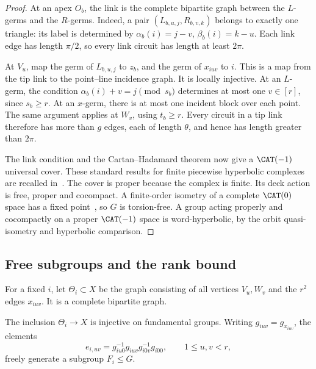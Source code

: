 \begin{proof}
At an apex \(O_b\), the link is the complete bipartite graph between
the \(L\)-germs and the \(R\)-germs. Indeed, a pair
\((L_{b,u,j},R_{b,v,k})\) belongs to exactly one triangle: its label
is determined by
\(\alpha_b(i)=j-v\), \(\beta_b(i)=k-u\).
Each link edge has length \(\pi/2\), so every link circuit has length
at least \(2\pi\).

At \(V_u\), map the germ of \(L_{b,u,j}\) to \(z_b\), and the germ
of \(x_{iuv}\) to \(i\). This is a map from the tip link to the
point--line incidence graph. It is locally injective. At an \(L\)-germ,
the condition \(\alpha_b(i)+v=j\pmod{s_b}\) determines at most one
\(v\in[r]\), since \(s_b\ge r\). At an \(x\)-germ, there is at most
one incident block over each point. The same argument applies at
\(W_v\), using \(t_b\ge r\).
Every circuit in a tip link therefore has more than \(g\) edges, each
of length \(\theta\), and hence has length greater than \(2\pi\).

The link condition and the Cartan--Hadamard theorem now give a
\(\CAT(-1)\) universal cover. These standard results for finite
piecewise hyperbolic complexes are recalled in~\cite[Theorems~I.7.50, II.5.2 and II.4.1(2),
and Lemma~II.5.6]{BH}. The cover is proper because the complex is finite.
Its deck action is free, proper and cocompact. A finite-order isometry
of a complete \(\CAT(0)\) space has a fixed point~\cite[Corollary~II.2.8(1)]{BH}, so
\(G\) is torsion-free. A group acting properly and cocompactly on a proper
\(\CAT(-1)\) space is word-hyperbolic, by the orbit quasi-isometry
\cite[Proposition~I.8.19]{BH} and hyperbolic comparison.
\end{proof}

\subsection{Free subgroups and the rank bound}

For a fixed \(i\), let \(\Theta_i\subset X\) be the graph consisting
of all vertices \(V_u,W_v\) and the \(r^2\) edges \(x_{iuv}\).
It is a complete bipartite graph.

\begin{lemma}\label{lem:free-core}
The inclusion \(\Theta_i\to X\) is injective on fundamental groups.
Writing \(g_{iuv}=g_{x_{iuv}}\), the elements
\begin{equation}\label{eq:free-generators}
 e_{i,uv}=g_{iu0}^{-1}g_{iuv}g_{i0v}^{-1}g_{i00},
 \qquad 1\le u,v<r,
\end{equation}
freely generate a subgroup \(F_i\le G\).
\end{lemma}

